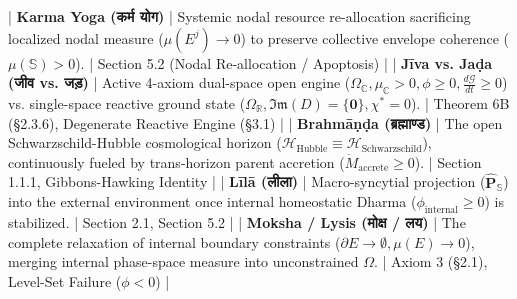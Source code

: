 \documentclass[11pt,a4paper]{article}
\theoremstyle{definition}
\theoremstyle{remark}
\begin{document}
| \textbf{Karma Yoga (कर्म योग)} | Systemic nodal resource re-allocation sacrificing localized nodal measure ($\mu(E^j) \to 0$) to preserve collective envelope coherence ($\mu(\mathbb{S}) > 0$). | Section 5.2 (Nodal Re-allocation / Apoptosis) |
| \textbf{Jīva vs. Jaḍa (जीव vs. जड़)} | Active 4-axiom dual-space open engine ($\Omega_{\mathbb{C}}, \mu_{\mathbb{C}} > 0, \phi \ge 0, \frac{d\mathcal{G}}{dt} \ge 0$) vs. single-space reactive ground state ($\Omega_{\mathbb{R}}, \mathfrak{Im}(D) = \{\mathbf{0}\}, \chi^* = 0$). | Theorem 6B (§2.3.6), Degenerate Reactive Engine (§3.1) |
| \textbf{Brahmāṇḍa (ब्रह्माण्ड)} | The open Schwarzschild-Hubble cosmological horizon ($\mathcal{H}_{\text{Hubble}} \equiv \mathcal{H}_{\text{Schwarzschild}}$), continuously fueled by trans-horizon parent accretion ($\dot{M}_{\text{accrete}} \ge 0$). | Section 1.1.1, Gibbons-Hawking Identity |
| \textbf{Līlā (लीला)} | Macro-syncytial projection ($\hat{\mathbf{P}}_{\mathbb{S}}$) into the external environment once internal homeostatic Dharma ($\phi_{\text{internal}} \ge 0$) is stabilized. | Section 2.1, Section 5.2 |
| \textbf{Moksha / Lysis (मोक्ष / लय)} | The complete relaxation of internal boundary constraints ($\partial E \to \emptyset, \mu(E) \to 0$), merging internal phase-space measure into unconstrained $\Omega$. | Axiom 3 (§2.1), Level-Set Failure ($\phi < 0$) |
\end{document}
